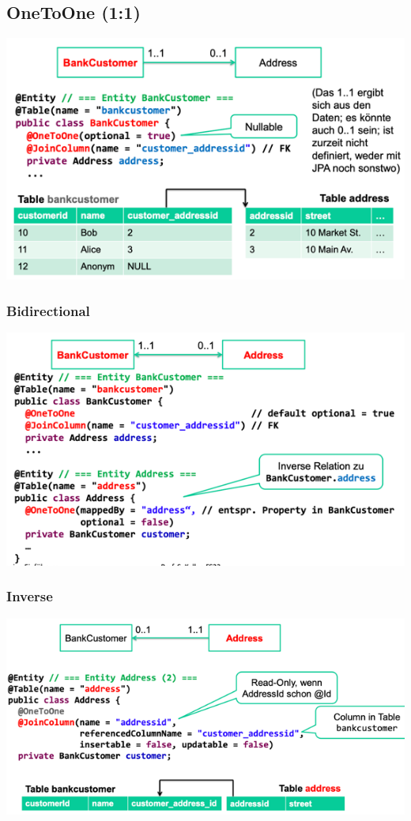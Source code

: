\documentclass[a4paper, landscape, 8pt]{scrartcl}
\begin{document}
\begin{multicols*}{4}
        \subsection{OneToOne (1:1)}
        \includegraphics[scale=0.25]{graphic/02-one-to-one}
        \subsubsection{Bidirectional}
        \includegraphics[scale=0.25]{graphic/03-bidirectional-one-to-one}
        \subsubsection{Inverse}
        \includegraphics[scale=0.25]{graphic/04-inverse-one-to-one}


\end{multicols*}
\end{document}
